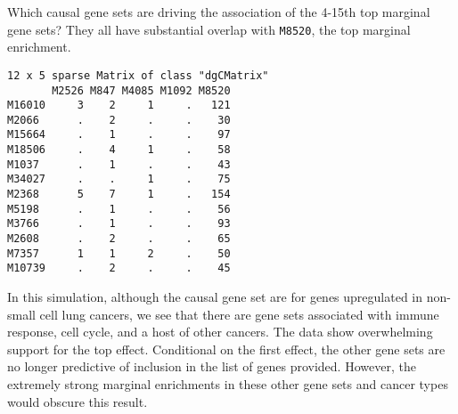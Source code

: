 \documentclass[
  letterpaper,
  DIV=11,
  numbers=noendperiod]{scrreprt}
\newenvironment{Shaded}{\begin{snugshade}}{\end{snugshade}}
\newcommand{\AttributeTok}[1]{\textcolor[rgb]{0.40,0.45,0.13}{#1}}
\newcommand{\DecValTok}[1]{\textcolor[rgb]{0.68,0.00,0.00}{#1}}
\newcommand{\FunctionTok}[1]{\textcolor[rgb]{0.28,0.35,0.67}{#1}}
\newcommand{\NormalTok}[1]{\textcolor[rgb]{0.00,0.23,0.31}{#1}}
\newcommand{\OtherTok}[1]{\textcolor[rgb]{0.00,0.23,0.31}{#1}}
\newcommand{\SpecialCharTok}[1]{\textcolor[rgb]{0.37,0.37,0.37}{#1}}
\begin{document}
Which causal gene sets are driving the association of the 4-15th top
marginal gene sets? They all have substantial overlap with
\texttt{M8520}, the top marginal enrichment.

\begin{Shaded}
\end{Shaded}

\begin{verbatim}
12 x 5 sparse Matrix of class "dgCMatrix"
       M2526 M847 M4085 M1092 M8520
M16010     3    2     1     .   121
M2066      .    2     .     .    30
M15664     .    1     .     .    97
M18506     .    4     1     .    58
M1037      .    1     .     .    43
M34027     .    .     1     .    75
M2368      5    7     1     .   154
M5198      .    1     .     .    56
M3766      .    1     .     .    93
M2608      .    2     .     .    65
M7357      1    1     2     .    50
M10739     .    2     .     .    45
\end{verbatim}

In this simulation, although the causal gene set are for genes
upregulated in non-small cell lung cancers, we see that there are gene
sets associated with immune response, cell cycle, and a host of other
cancers. The data show overwhelming support for the top effect.
Conditional on the first effect, the other gene sets are no longer
predictive of inclusion in the list of genes provided. However, the
extremely strong marginal enrichments in these other gene sets and
cancer types would obscure this result.
\end{document}
